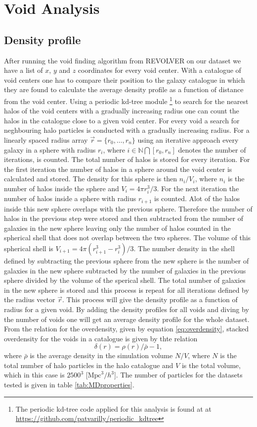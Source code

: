 \section{Void Analysis}
\subsection{Density profile}\label{sec:voiddensity}
After running the void finding algorithm from REVOLVER on our dataset we have a list of $x$, $y$
and $z$ coordinates for every void center. With a catalogue of void centers one
has to compare their position to the galaxy catalogue in which they are found to
calculate the average density profile as a function of distance from the void
center. Using a periodic kd-tree module \footnote{The periodic kd-tree code
applied for this analysis is found at at \url{https://github.com/patvarilly/periodic_kdtree}} to search for
the nearest halos of the void centers with a gradually increasing radius one can count the halos in
the catalogue close to a given void center. For every void a search for
neghbouring halo particles is conducted with a gradually increasing radius. For
a linearly spaced radius array $\vec{r}=\{r_0,\dots,r_{n}\}$ using an iterative
approach every galaxy in a sphere with radius $r_{i}$, where
$i\in\mathbb{N}\bigcap [r_0,r_{n}]$ denotes the
number of iterations, is counted. The total number of halos is stored for
every iteration. For the first iteration the number of halos in a sphere around the void
center is calculated and stored. The density for this sphere is then $n_i/V_i$,
where $n_i$ is the number of halos inside the sphere and $V_i=4\pi r_{i}^3/3$. For
the next iteration the number of halos inside a sphere with radius $r_{i+1}$ is
counted. Alot of the halos inside this new sphere overlaps with the previous
sphere. Therefore the number of halos in the previous step were stored and then
subtracted from the number of galaxies in the new sphere leaving only the number
of halos counted in the spherical shell that does not overlap between the two
spheres. The volume of this spherical shell is $V_{i+1}=4\pi(r_{i+1}^3-r_i^3)/3$. The
number density in the shell defined by subtracting the previous sphere from the
new sphere is the number of galaxies in the new sphere subtracted by the number
of galaxies in the previous sphere divided by the volume of the sperical shell.
The total number of galaxies in the new sphere is stored and this process is
repeat for all iterations defined by the radius vector $\vec{r}$. This process
will give the density profile as a function of radius for a given void. By
adding the density profiles for all voids and diving by the number of voids one
will get an average density profile for the whole dataset. From the relation for the overdensity, given by equation \ref{eq:overdensity},
stacked overdensity for the voids in a catalogue is given by thte relation
\begin{equation}
    \delta(r)=\rho(r)/\bar{\rho}-1,
\end{equation}
where $\bar{\rho}$ is the average density in the simulation volume $N/V$, where $N$ is the total number of halo particles in the halo catalogue
and $V$ is the total volume, which in this case is $2500^3$ [$\mathrm{Mpc}^3/h^3$]. The number of particles for the datasets tested is given in table \ref{tab:MDproperties}. 
